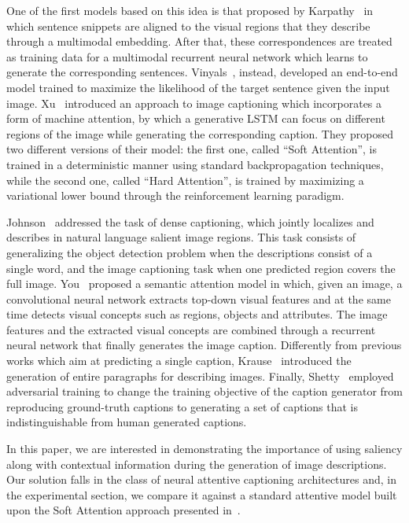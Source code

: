 One of the first models based on this idea is that proposed by Karpathy~\etal\cite{karpathy2015deep} in which sentence snippets are aligned to the visual regions that they describe through a multimodal embedding. After that, these correspondences are treated as training data for a multimodal recurrent neural network which learns to generate the corresponding sentences. Vinyals~\etal\cite{vinyals2015show}, instead, developed an end-to-end model trained to maximize the likelihood of the target sentence given the input image. Xu~\etal\cite{icml2015xuc15} introduced an approach to image captioning which incorporates a form of machine attention, by which a generative LSTM can focus on different regions of the image while generating the corresponding caption. They proposed two different versions of their model: the first one, called ``Soft Attention'', is trained in a deterministic manner using standard backpropagation techniques, while the second one, called ``Hard Attention'', is trained by maximizing a variational lower bound through the reinforcement learning paradigm.

Johnson~\etal\cite{johnson2016densecap} addressed the task of dense captioning, which jointly localizes and describes in natural language salient image regions. This task consists of generalizing the object detection problem when the descriptions consist of a single word, and the image captioning task when one predicted region covers the full image. You~\etal\cite{you2016image} proposed a semantic attention model in which, given an image, a convolutional neural network extracts top-down visual features and at the same time detects visual concepts such as regions, objects and attributes. The image features and the extracted visual concepts are combined through a recurrent neural network that finally generates the image caption. 
Differently from previous works which aim at predicting a single caption, Krause~\etal\cite{krause2016hierarchical} introduced the generation of entire paragraphs for describing images. Finally, Shetty~\etal\cite{shetty2017speaking} employed adversarial training to change the training objective of the caption generator from reproducing ground-truth captions to generating a set of captions that is indistinguishable from human generated captions.

In this paper, we are interested in demonstrating the importance of using saliency along with contextual information during the generation of image descriptions. Our solution falls in the class of neural attentive captioning architectures and, in the experimental section, we compare it against a standard attentive model built upon the Soft Attention approach presented in~\cite{icml2015xuc15}.


